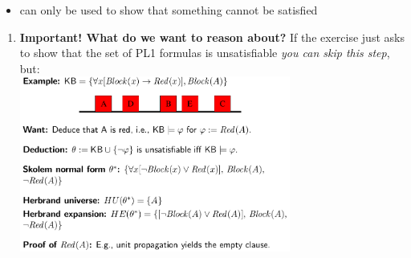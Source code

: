\documentclass[conference]{styles/acmsiggraph}
\begin{document}
\begin{itemize}
    \item can only be used to show that something cannot be satisfied
\end{itemize}

\begin{enumerate}
    \item \textbf{Important! What do we want to reason about?} If the exercise just asks to show that the set of PL1 formulas is unsatisfiable \textit{you can skip this step}, but:\\
    \includegraphics[width=0.7\textwidth]{imgs/herbrand-example.png}


\end{enumerate}
\end{document}
